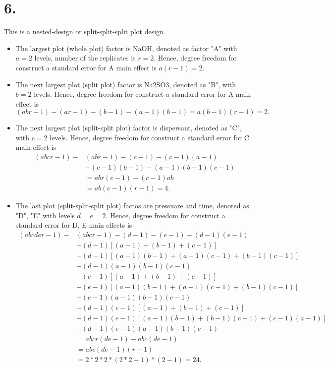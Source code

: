 \documentclass{article}\usepackage[]{graphicx}\usepackage[]{color}
\begin{document}
\section*{6.}

This is a nested-design or split-split-split plot design. 
\begin{itemize}
\item The largest plot (whole plot) factor is NaOH, denoted as factor "A" with $a = 2$ levels, number of the replicates is $r = 2$. Hence, 
degree freedom for construct a standard error for A main effect is $a(r-1) = 2$.
\item The next largest plot (split plot) factor is Na2SO3, denoted as "B", with $b = 2$ levels. 
Hence, 
degree freedom for construct a standard error for A main effect is 
\[
(abr -1) - (ar-1) - (b-1) - (a-1)(b-1)= a(b-1)(r-1) = 2.
\]

\item The next largest plot (split-split plot) factor is dispersant, denoted as "C", with $c = 2$ levels. 
Hence, 
degree freedom for construct a standard error for C main effect is 
\begin{align*}
(abcr -1) - & (abr-1) - (c-1) - (c-1)(a-1)\\
& - (c-1)(b-1) - (a-1)(b-1)(c-1) \\
& = abr(c-1) - (c-1)ab\\
& = ab(c-1)(r-1) =4.
\end{align*}
\item The last plot (split-split-split plot) factos are pressuare and time, denoted as "D", "E"
with levels $d = e= 2$. 
Hence, 
degree freedom for construct a standard error for D, E main effects is 
\begin{align*}
(abcder -1) -& (abcr-1) - (d-1) - (e-1) - (d-1)(e-1) \\
             & -(d-1)[(a-1) + (b-1) + (c-1)] \\
             & - (d-1)[(a-1)(b-1) + (a-1)(c-1) + (b-1)(c-1)]\\
             & - (d-1)(a-1)(b-1)(c-1)\\
             & -(e-1)[(a-1) + (b-1) + (c-1)] \\
             & - (e-1)[(a-1)(b-1) + (a-1)(c-1) + (b-1)(c-1)]\\
             & - (e-1)(a-1)(b-1)(c-1)\\
             & - (d-1)(e-1)[(a-1) +(b-1) + (c-1)]\\
             & - (d-1)(e-1)[(a-1)(b-1) +(b-1)(c-1) + (c-1)(a-1)]\\
             & - (d-1)(e-1)(a-1)(b-1)(c-1)\\
             &= abcr(de-1) - abc(de-1)\\
             & = abc(de-1)(r-1)\\
             & = 2*2*2*(2*2-1)*(2-1) = 24.
\end{align*}
\end{itemize}
\end{document}
